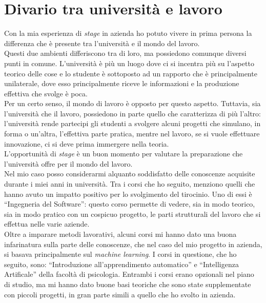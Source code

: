 \section{Divario tra università e lavoro}\label{sec:uni-work-diff}\noindent
Con la mia esperienza di \textit{stage} in azienda ho potuto vivere in prima persona la differenza che è presente tra l'università e il mondo del lavoro.\\
Questi due ambienti differiscono tra di loro, ma possiedono comunque diversi punti in comune. L'università è più un luogo dove ci si incentra più su l'aspetto teorico delle cose e lo studente è sottoposto ad un rapporto che è principalmente unilaterale, dove esso principalmente riceve le informazioni e la produzione effettiva che svolge è poca.\\
Per un certo senso, il mondo di lavoro è opposto per questo aspetto. Tuttavia, sia l'università che il lavoro, possiedono in parte quello che caratterizza di più l'altro: l'università rende partecipi gli studenti a svolgere alcuni progetti che simulano, in forma o un'altra, l'effettiva parte pratica, mentre nel lavoro, se si vuole effettuare innovazione, ci si deve prima immergere nella teoria.\\
L'opportunità di \textit{stage} è un buon momento per valutare la preparazione che l'università offre per il mondo del lavoro. \\ Nel mio caso posso considerarmi alquanto soddisfatto delle conoscenze acquisite durante i miei anni in università.
Tra i corsi che ho seguito, menziono quelli che hanno avuto un impatto positivo per lo svolgimento del tirocinio. Uno di essi è ``Ingegneria del Software'': questo corso permette di vedere, sia in modo teorico, sia in modo pratico con un cospicuo progetto, le parti strutturali del lavoro che si effettua nelle varie aziende.\\
Oltre a imparare metodi lavorativi, alcuni corsi mi hanno dato una buona infarinatura sulla parte delle conoscenze, che nel caso del mio progetto in azienda, si basava principalmente sul \textit{machine learning}. I corsi in questione, che ho seguito, sono: ``Introduzione all'apprendimento automatico'' e ``Intelligenza Artificale'' della facoltà di psicologia. Entrambi i corsi erano opzionali nel piano di studio, ma mi hanno dato buone basi teoriche che sono state supplementate con piccoli progetti, in gran parte simili a quello che ho svolto in azienda.
